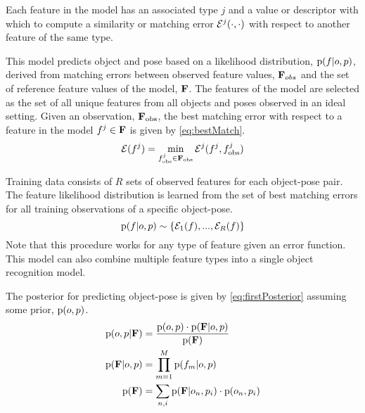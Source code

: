             Each feature in the model has an associated type $j$ and a value or descriptor with which to compute a similarity or matching error $\mathcal{E}^j(\cdot,\cdot)$ with respect to another feature of the same type.

            This model predicts object and pose based on a likelihood distribution, $\text{p}(f|o,p)$, derived from matching errors between observed feature values, $\mathbf{F}_{obs}$ and the set of reference feature values of the model, $\mathbf{F}$. The features of the model are selected as the set of all unique features from all objects and poses observed in an ideal setting. Given an observation, $\mathbf{F}_{\text{obs}}$, the best matching error with respect to a feature in the model $f^j \in \mathbf{F}$ is given by \eqref{eq:bestMatch}.
            \begin{equation}
                \label{eq:bestMatch}
                \cursive{E}(f^j) = \min_{f^j_{\text{obs}} \in \set{F}_{\text{obs}}}\cursive{E}^j(f^j,f^j_{\text{obs}})
            \end{equation}
            
            Training data consists of $R$ sets of observed features for each object-pose pair. The feature likelihood distribution is learned from the set of best matching errors for all training observations of a specific object-pose.
            \begin{equation}
                \text{p}(f|o,p) \sim \{\mathcal{E}_1(f), ...,  \mathcal{E}_R(f)\}
            \end{equation}
            Note that this procedure works for any type of feature given an error function. This model can also combine multiple feature types into a single object recognition model. 
            
            The posterior for predicting object-pose is given by \eqref{eq:firstPosterior} assuming some prior, $\text{p}(o,p)$.
            \begin{align}
                \label{eq:firstPosterior}
                \prob{o,p|\set{F}} &= \frac{\prob{o,p} \cdot \prob{\set{F}|o,p}}{\prob{\set{F}}}\\
                \label{eq:setFeatureLikelihood}
                \prob{\set{F}|o,p} &= \prod_{m=1}^{M} \prob{f_m|o,p}\\
                \label{eq:setFeatureEvidence}
                \prob{\set{F}} &= \sum_{n,i} \prob{\set{F}|o_n,p_i}\cdot \prob{o_n,p_i}
            \end{align}

